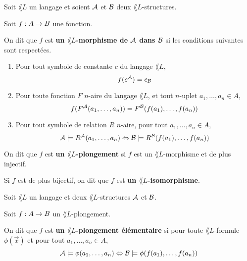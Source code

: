 \documentclass[a4paper, 12pt]{report}
\begin{document}
\begin{definition} 
	Soit $\lang{L}$ un langage et soient $\mathcal{A}$ et $\mathcal{B}$ deux
	$\lang{L}$-structures.

	Soit $f : A \rightarrow B$ une fonction.

	On dit que $f$ est \textbf{un $\lang{L}$-morphisme de $\mathcal{A}$ dans $\mathcal{B}$}
	si les conditions suivantes sont respectées.

	\begin{enumerate}
		\item Pour tout symbole de constante $c$ du langage $\lang{L}$,
			\begin{equation}
				f(c^{\mathcal{A}}) = c_{\mathcal{B}}
			\end{equation}
		\item Pour toute fonction $F$ $n$-aire du langage $\lang{L}$, et tout
		$n$-uplet $a_{1}, \dots, a_{n} \in A$,
			\begin{equation}
				f(F^{\mathcal{A}}(a_{1}, \dots, a_{n})) =
				F^{\mathcal{B}}(f(a_{1}), \dots, f(a_{n}))
			\end{equation}
		\item Pour tout symbole de relation $R$ $n$-aire, pour tout $a_{1},
			\dots, a_{n} \in A$,
			\begin{equation}
				\mathcal{A} \models R^{\mathcal{A}}(a_{1}, \dots, a_{n})
				\Leftrightarrow \mathcal{B} \models R^{\mathcal{B}}(f(a_{1}),
				\dots, f(a_{n}))
			\end{equation}
	\end{enumerate}

	On dit que $f$ est \textbf{un $\lang{L}$-plongement} si $f$ est un
	$\lang{L}$-morphisme et de plus injectif.

	Si $f$ est de plus bijectif, on dit que $f$ est \textbf{un
		$\lang{L}$-isomorphisme}.
\end{definition}

\begin{definition} 
	Soit $\lang{L}$ un langage et deux $\lang{L}$-structures $\mathcal{A}$ et
	$\mathcal{B}$.

	Soit $f : A \rightarrow B$ un $\lang{L}$-plongement.

	On dit que $f$ est \textbf{un $\lang{L}$-plongement élémentaire} si pour
	toute $\lang{L}$-formule $\phi(\vec{x})$ et pour tout $a_{1}, \dots, a_{n}
	\in A$,
	\begin{equation}
		\mathcal{A} \models \phi(a_{1}, \dots, a_{n}) \Leftrightarrow \mathcal{B} \models
		\phi(f(a_{1}), \dots, f(a_{n}))
	\end{equation}
\end{definition}
\end{document}
